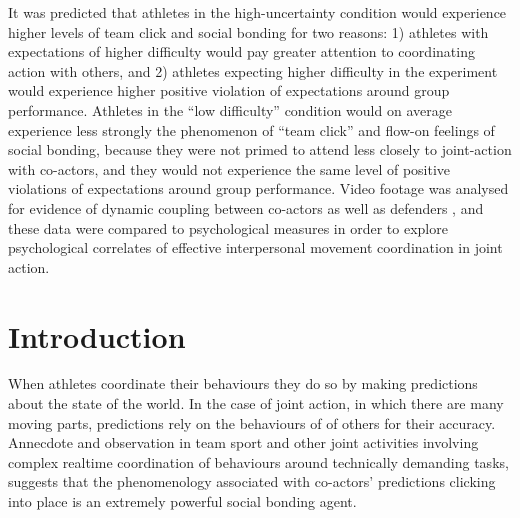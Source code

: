 \documentclass[english]{article}\usepackage[]{graphicx}\usepackage[]{color}
\begin{document}
It was predicted that athletes in the high-uncertainty condition would experience higher levels of team click and social bonding for two reasons: 1) athletes with expectations of higher difficulty would pay greater attention to coordinating action with others, and 2) athletes expecting higher difficulty in the experiment would experience higher positive violation of expectations around group performance.  Athletes in the ``low difficulty'' condition would on average experience less strongly the phenomenon of ``team click'' and flow-on feelings of social bonding, because they were not primed to attend less closely to joint-action with co-actors, and they would not experience the same level of positive violations of expectations around group performance.   Video footage was analysed for evidence of dynamic coupling between co-actors as well as defenders \citep{Schmidt2011,Richardson2012,Passos2012}, and these data were compared to psychological measures in order to explore psychological correlates of effective  interpersonal movement coordination in joint action.


\section{Introduction}
When athletes coordinate their behaviours they do so by making predictions about the state of the world.  In the case of joint action, in which there are many moving parts, predictions rely on the behaviours of
of others for their accuracy. Annecdote and observation in team sport and other joint activities involving complex realtime coordination of behaviours around technically demanding tasks, suggests that the phenomenology associated with co-actors' predictions clicking into place is an extremely powerful social bonding agent.
\end{document}
